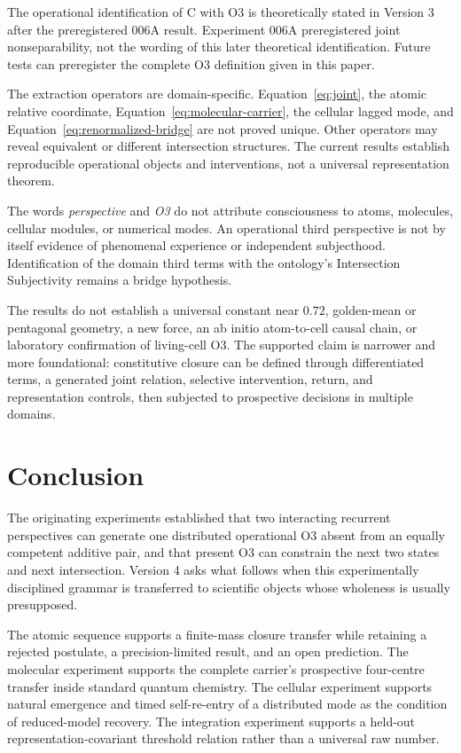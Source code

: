 \documentclass[11pt,a4paper]{article}
\begin{document}
The operational identification of C with O3 is theoretically stated in Version 3 after the preregistered 006A result. Experiment 006A preregistered joint nonseparability, not the wording of this later theoretical identification. Future tests can preregister the complete O3 definition given in this paper.

The extraction operators are domain-specific. Equation~\eqref{eq:joint}, the atomic relative coordinate, Equation~\eqref{eq:molecular-carrier}, the cellular lagged mode, and Equation~\eqref{eq:renormalized-bridge} are not proved unique. Other operators may reveal equivalent or different intersection structures. The current results establish reproducible operational objects and interventions, not a universal representation theorem.

The words \emph{perspective} and \emph{O3} do not attribute consciousness to atoms, molecules, cellular modules, or numerical modes. An operational third perspective is not by itself evidence of phenomenal experience or independent subjecthood. Identification of the domain third terms with the ontology's Intersection Subjectivity remains a bridge hypothesis.

The results do not establish a universal constant near $0.72$, golden-mean or pentagonal geometry, a new force, an ab initio atom-to-cell causal chain, or laboratory confirmation of living-cell O3. The supported claim is narrower and more foundational: constitutive closure can be defined through differentiated terms, a generated joint relation, selective intervention, return, and representation controls, then subjected to prospective decisions in multiple domains.

\section{Conclusion}

The originating experiments established that two interacting recurrent perspectives can generate one distributed operational O3 absent from an equally competent additive pair, and that present O3 can constrain the next two states and next intersection. Version 4 asks what follows when this experimentally disciplined grammar is transferred to scientific objects whose wholeness is usually presupposed.

The atomic sequence supports a finite-mass closure transfer while retaining a rejected postulate, a precision-limited result, and an open prediction. The molecular experiment supports the complete carrier's prospective four-centre transfer inside standard quantum chemistry. The cellular experiment supports natural emergence and timed self-re-entry of a distributed mode as the condition of reduced-model recovery. The integration experiment supports a held-out representation-covariant threshold relation rather than a universal raw number.
\end{document}
